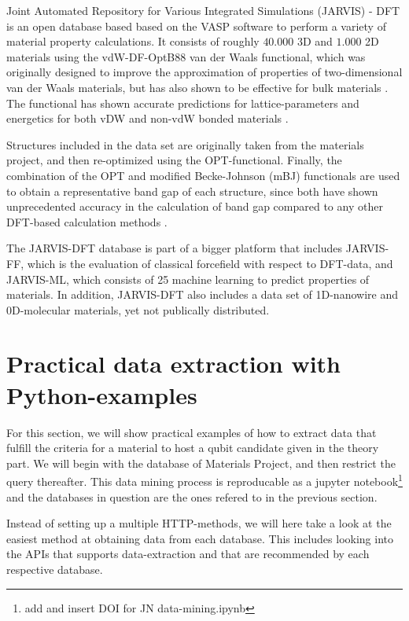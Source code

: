Joint Automated Repository for Various Integrated Simulations (JARVIS) \cite{Choudhary2020} - DFT is an open database based based on the VASP software to perform a variety of material property calculations. It consists of roughly $40.000$ 3D and $1.000$ 2D materials using the vdW-DF-OptB88 van der Waals functional, which was originally designed to improve the approximation of properties of two-dimensional van der Waals materials, but has also shown to be effective for bulk materials \cite{Thonhauser2007, Klimes2011}. The functional has shown accurate predictions for lattice-parameters and energetics for both vDW and non-vdW bonded materials  \cite{Choudhary2018}.

Structures included in the data set are originally taken from the materials project, and then re-optimized using the OPT-functional. Finally, the combination of the OPT and modified Becke-Johnson (mBJ) functionals are used to obtain a representative band gap of each structure, since both have shown unprecedented accuracy in the calculation of band gap compared to any other DFT-based calculation methods \cite{Choudhary2018a}.


The JARVIS-DFT database is part of a bigger platform that includes JARVIS-FF, which is the evaluation of classical forcefield with respect to DFT-data, and JARVIS-ML, which consists of 25 machine learning to predict properties of materials. In addition, JARVIS-DFT also includes a data set of 1D-nanowire and 0D-molecular materials, yet not publically distributed.

\section{Practical data extraction with Python-examples}

For this section, we will show practical examples of how to extract data that fulfill the criteria for a material to host a qubit candidate given in the theory part. We will begin with the database of Materials Project, and then restrict the query thereafter. This data mining process is reproducable as a jupyter notebook\footnote{add and insert DOI for JN data-mining.ipynb} and the databases in question are the ones refered to in the previous section.

Instead of setting up a multiple HTTP-methods, we will here take a look at the easiest method at obtaining data from each database. This includes looking into the APIs that supports data-extraction and that are recommended by each respective database.

